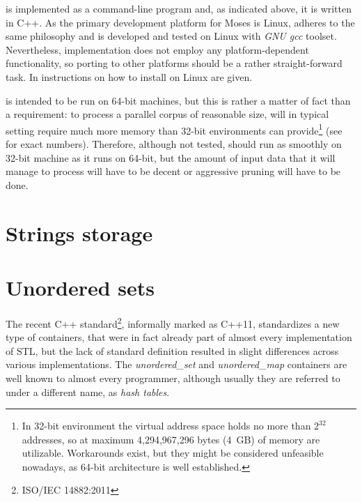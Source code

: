 
\Eppex{} is implemented as a command-line program and, as indicated above, it is written in C++.
As the primary development platform for Moses is Linux,
\eppex{} adheres to the same philosophy and is developed and tested on Linux with \emph{GNU gcc}
toolset.
Nevertheless, \eppex{} implementation does not employ any platform-dependent functionality,
so porting to other platforms should be a rather straight-forward task.
In  instructions on how to install \eppex{} on Linux are given.

\Eppex{} is intended to be run on 64-bit machines, but this is rather a matter of fact than
a requirement: to process a parallel corpus of reasonable size, \eppex{} will in typical
setting require much more memory than 32-bit environments can provide\footnote{In 32-bit
environment the virtual address space holds no more than $2^{32}$ addresses, so at maximum
4,294,967,296 bytes (4~GB) of memory are utilizable. Workarounds exist, but they might be
considered unfeasible nowadays, as 64-bit architecture is well established.} (see 
for exact numbers).
Therefore, although not tested, \eppex{} should run as smoothly on 32-bit machine as it runs
on 64-bit, but the amount of input data that it will manage to process will have to be decent
or aggressive pruning will have to be done.

\section{Strings storage}

\section{Unordered sets}

The recent C++ standard\footnote{ISO/IEC 14882:2011}, informally marked as C++11, standardizes
a new type of containers, that were in fact already part of almost every implementation of STL,
but the lack of standard definition resulted in slight differences across various implementations.
The \emph{unordered_set} and \emph{unordered_map} containers are well known to almost every
programmer, although usually they are referred to under a different name, as \emph{hash tables}.

